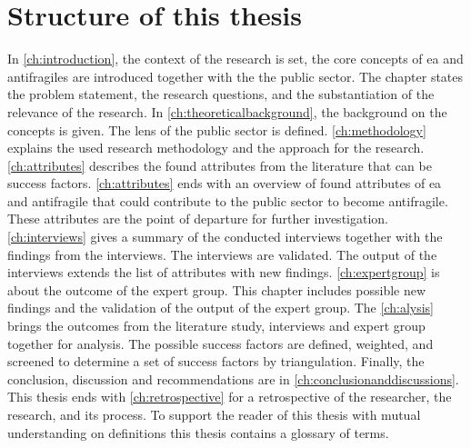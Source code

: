 \section{Structure of this thesis}
\label{sec:structure}
In \cref{ch:introduction}, the context of the research is set, the core concepts of \acrshort{ea} and \glspl{antifragile} are introduced together with the the public sector. The chapter states the problem statement, the research questions, and the substantiation of the relevance of the research. In \cref{ch:theoreticalbackground}, the background on the concepts is given. The lens of the public sector is defined. \cref{ch:methodology} explains the used research methodology and the approach for the research. \cref{ch:attributes} describes the found attributes from the literature that can be success factors. \cref{ch:attributes} ends with an overview of found attributes of \acrshort{ea} and \gls{antifragile} that could contribute to the public sector to become \gls{antifragile}. These attributes are the point of departure for further investigation. \cref{ch:interviews} gives a summary of the conducted interviews together with the findings from the interviews. The interviews are validated. The output of the interviews extends the list of attributes with new findings. \cref{ch:expertgroup} is about the outcome of the expert group. This chapter includes possible new findings and the validation of the output of the expert group. The \cref{ch:alysis} brings the outcomes from the literature study, interviews and expert group together for analysis. The possible success factors are defined, weighted, and screened to determine a set of success factors by triangulation. Finally, the conclusion, discussion and recommendations are in \cref{ch:conclusionanddiscussions}. This thesis ends with \cref{ch:retrospective} for a retrospective of the researcher, the research, and its process. To support the reader of this thesis with mutual understanding on definitions this thesis contains a glossary of terms.
